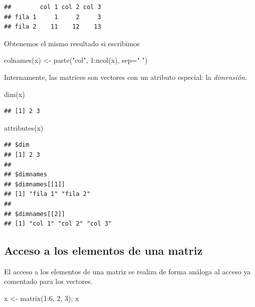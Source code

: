 \documentclass[
]{book}
\newenvironment{Shaded}{\begin{snugshade}}{\end{snugshade}}
\newcommand{\AttributeTok}[1]{\textcolor[rgb]{0.77,0.63,0.00}{#1}}
\newcommand{\DecValTok}[1]{\textcolor[rgb]{0.00,0.00,0.81}{#1}}
\newcommand{\FunctionTok}[1]{\textcolor[rgb]{0.00,0.00,0.00}{#1}}
\newcommand{\NormalTok}[1]{#1}
\newcommand{\OtherTok}[1]{\textcolor[rgb]{0.56,0.35,0.01}{#1}}
\newcommand{\SpecialCharTok}[1]{\textcolor[rgb]{0.00,0.00,0.00}{#1}}
\newcommand{\StringTok}[1]{\textcolor[rgb]{0.31,0.60,0.02}{#1}}
\theoremstyle{break}
\begin{document}
\begin{verbatim}
##        col 1 col 2 col 3
## fila 1     1     2     3
## fila 2    11    12    13
\end{verbatim}

Obtenemos el mismo resultado si escribimos

\begin{Shaded}
\begin{Highlighting}[]
\FunctionTok{colnames}\NormalTok{(x) }\OtherTok{\textless{}{-}} \FunctionTok{paste}\NormalTok{(}\StringTok{"col"}\NormalTok{, }\DecValTok{1}\SpecialCharTok{:}\FunctionTok{ncol}\NormalTok{(x), }\AttributeTok{sep=}\StringTok{" "}\NormalTok{)}
\end{Highlighting}
\end{Shaded}

Internamente, las matrices son vectores con un atributo especial: la \emph{dimensión}.

\begin{Shaded}
\begin{Highlighting}[]
\FunctionTok{dim}\NormalTok{(x)}
\end{Highlighting}
\end{Shaded}

\begin{verbatim}
## [1] 2 3
\end{verbatim}

\begin{Shaded}
\begin{Highlighting}[]
\FunctionTok{attributes}\NormalTok{(x)}
\end{Highlighting}
\end{Shaded}

\begin{verbatim}
## $dim
## [1] 2 3
## 
## $dimnames
## $dimnames[[1]]
## [1] "fila 1" "fila 2"
## 
## $dimnames[[2]]
## [1] "col 1" "col 2" "col 3"
\end{verbatim}

\hypertarget{acceso-a-los-elementos-de-una-matriz}{%
\subsection{Acceso a los elementos de una matriz}\label{acceso-a-los-elementos-de-una-matriz}}

El acceso a los elementos de una matriz se realiza de forma análoga al acceso ya
comentado para los vectores.

\begin{Shaded}
\begin{Highlighting}[]
\NormalTok{x }\OtherTok{\textless{}{-}} \FunctionTok{matrix}\NormalTok{(}\DecValTok{1}\SpecialCharTok{:}\DecValTok{6}\NormalTok{, }\DecValTok{2}\NormalTok{, }\DecValTok{3}\NormalTok{); x}
\end{Highlighting}
\end{Shaded}
\end{document}
